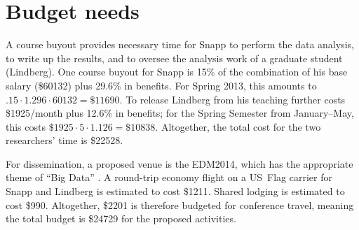 \documentclass[12pt]{article}
\begin{document}
\section{Budget needs}

A course buyout provides necessary time for Snapp to perform the data
analysis, to write up the results, and to oversee the analysis work of
a graduate student (Lindberg).  One course buyout for Snapp is 15\% of
the combination of his base salary (\$60132) plus 29.6\% in
benefits. For Spring 2013, this amounts to $.15 \cdot 1.296\cdot
60132=\$11690$.  To release Lindberg from his teaching further costs
\$1925/month plus 12.6\% in benefits; for the Spring Semester from
January--May, this costs $\$1925 \cdot 5 \cdot 1.126 = \$10838$.
Altogether, the total cost for the two researchers' time is \$22528.

For dissemination, a proposed venue is the
EDM2014, which has the appropriate theme of ``Big Data'' \parencite{edm-2014}.  A
round-trip economy flight on a US~Flag carrier for Snapp and Lindberg
is estimated to cost \$1211.  Shared lodging is estimated to cost
\$990.  Altogether, \$2201 is therefore budgeted for conference
travel, meaning the total budget is \$24729 for the proposed
activities.

\pagebreak
\printbibliography
\end{document}
